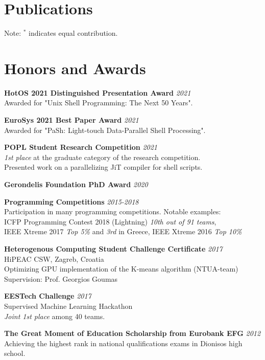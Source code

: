 \documentclass[margin]{res}
\begin{document}
\begin{resume}
\section{Publications}



Note: $^*$ indicates equal contribution.

\section{Honors and Awards}

\textbf{HotOS 2021 Distinguished Presentation Award} \hfill {\em 2021} \\
Awarded for "Unix Shell Programming: The Next 50 Years".

\textbf{EuroSys 2021 Best Paper Award} \hfill {\em 2021} \\
Awarded for "PaSh: Light-touch Data-Parallel Shell Processing".

\textbf{POPL Student Research Competition} \hfill {\em 2021} \\
\textit{1st place} at the graduate category of the research competition. \\
Presented work on a parallelizing JiT compiler for shell scripts. 

\textbf{Gerondelis Foundation PhD Award} \hfill {\em 2020}

\textbf{Programming Competitions}  \hfill {\em 2015-2018} \\
Participation in many programming competitions. Notable examples: \\
ICFP Programming Contest 2018 (Lightning) \textit{10th out of 91 teams}, \\
IEEE Xtreme 2017 \textit{Top 5\%} and \textit{3rd} in Greece, IEEE Xtreme 2016 \textit{Top 10\%}

\textbf{Heterogenous Computing Student Challenge Certificate}  \hfill {\em 2017} \\
HiPEAC CSW, Zagreb, Croatia \\
Optimizing GPU implementation of the K-means algorithm (NTUA-team) \\
Supervision: Prof. Georgios Goumas

\textbf{EESTech Challenge}  \hfill {\em 2017} \\ 
Supervised Machine Learning Hackathon \\
\textit{Joint 1st place} among 40 teams.

\textbf{The Great Moment of Education Scholarship from Eurobank EFG}  \hfill {\em 2012} \\ 
Achieving the highest rank in national qualifications exams in Dionisos high school.


\end{resume}
\end{document}

